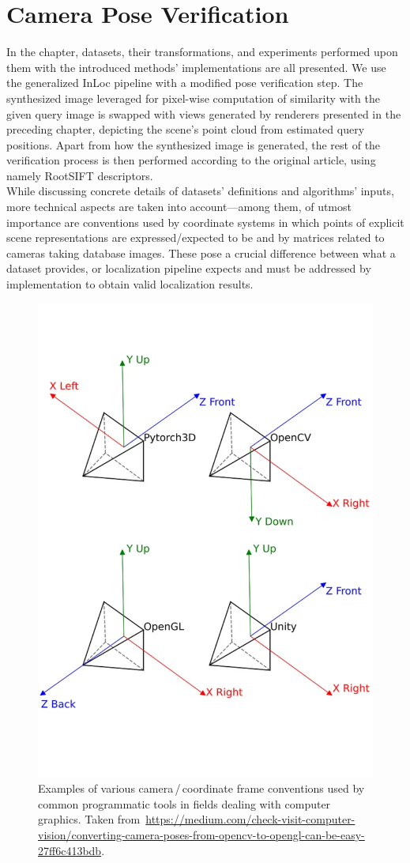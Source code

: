 \chapter{Camera Pose Verification} \label{chap:pose_verification}

In the chapter, datasets, their transformations, and experiments performed upon them with
the introduced methods' implementations are all presented. We use the generalized InLoc
pipeline with a modified pose verification step. The synthesized image leveraged for
pixel-wise computation of similarity with the given query image is swapped with views
generated by renderers presented in the preceding chapter, depicting the scene's point
cloud from estimated query positions. Apart from how the synthesized image is generated,
the rest of the verification process is then performed according to the original article,
using namely RootSIFT descriptors.\\

While discussing concrete details of datasets' definitions and algorithms' inputs, more
technical aspects are taken into account---among them, of utmost importance are
conventions used by coordinate systems in which points of explicit scene representations
are expressed/expected to be and by matrices related to cameras taking database images.
These pose a crucial difference between what a dataset provides, or localization pipeline
expects and must be addressed by implementation to obtain valid localization results.

\begin{figure}
    \centering
    \includegraphics[width=.7\textwidth]{../graphics/cs_conventions.png}
    \caption[Examples of various camera\,/\,coordinate frame conventions]{
    Examples of various camera\,/\,coordinate frame conventions used by
    common programmatic tools in fields dealing with computer graphics.
    Taken from~\url{https://medium.com/check-visit-computer-vision/converting-camera-poses-from-opencv-to-opengl-can-be-easy-27ff6c413bdb}.}\label{fig:cs_conventions}
\end{figure}

